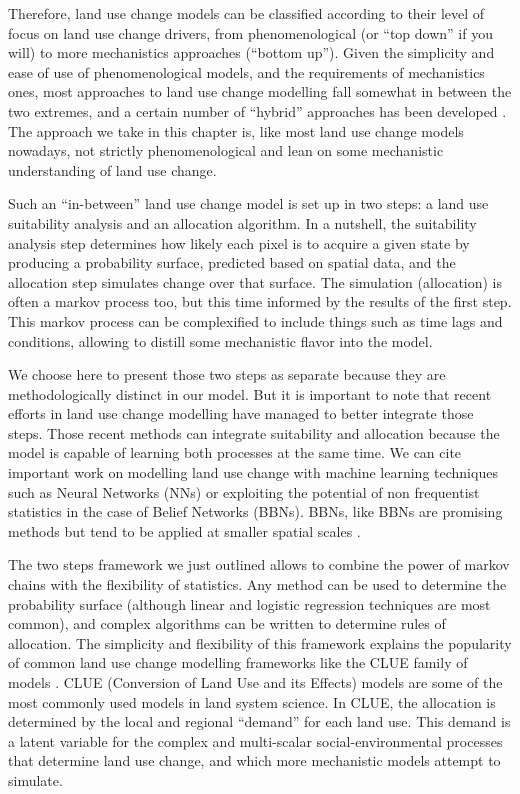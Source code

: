 Therefore, land use change models can be classified according to their level of focus on land use change drivers, from phenomenological (or “top down” if you will) to more mechanistics approaches (“bottom up”). Given the simplicity and ease of use of phenomenological models, and the requirements of mechanistics ones, most approaches to land use change modelling fall somewhat in between the two extremes, and a certain number of “hybrid” approaches has been developed \citep{sun_comparison_2018, jokar_arsanjani_integration_2013}. The approach we take in this chapter is, like most land use change models nowadays, not strictly phenomenological and lean on some mechanistic understanding of land use change.

Such an “in-between” land use change model is set up in two steps: a land use suitability analysis and an allocation algorithm. In a nutshell, the suitability analysis step determines how likely each pixel is to acquire a given state by producing a probability surface, predicted based on spatial data, and the allocation step simulates change over that surface. The simulation (allocation) is often a markov process too, but this time informed by the results of the first step. This markov process can be complexified to include things such as time lags and conditions, allowing to distill some mechanistic flavor into the model.

We choose here to present those two steps as separate because they are methodologically distinct in our model. But it is important to note that recent efforts in land use change modelling have managed to better integrate those steps. Those recent methods can integrate suitability and allocation because the model is capable of learning both processes at the same time. We can cite important work on modelling land use change with machine learning techniques such as Neural Networks (NNs) \citep{tayyebi_simulating_2013} or exploiting the potential of non frequentist statistics in the case of Belief Networks (BBNs). BBNs, like BBNs are promising methods but tend to be applied at smaller spatial scales \citep{celio_modeling_2014}.

The two steps framework we just outlined allows to combine the power of markov chains with the flexibility of statistics. Any method can be used to determine the probability surface (although linear and logistic regression techniques are most common), and complex algorithms can be written to determine rules of allocation. The simplicity and flexibility of this framework explains the popularity of common land use change modelling frameworks like the CLUE family of models \citep{verburg_modeling_2002, verburg_combining_2009}. CLUE (Conversion of Land Use and its Effects) models are some of the most commonly used models in land system science. In CLUE, the allocation is determined by the local and regional “demand” for each land use. This demand is a latent variable for the complex and multi-scalar social-environmental processes that determine land use change, and which more mechanistic models attempt to simulate.

